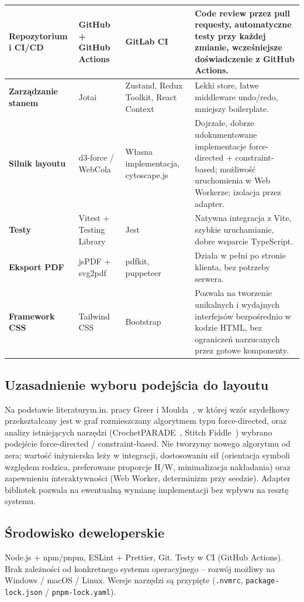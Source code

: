 \documentclass[a4paper,11pt]{article}
\begin{document}
\begin{xltabular}{0.95\textwidth}{|p{2.5cm}|p{2.3cm}|p{3.8cm}|X|}
  \hline
  \textbf{Repozytorium i CI/CD} & GitHub + GitHub Actions & GitLab CI & Code review przez pull requesty, automatyczne testy przy każdej zmianie, wcześniejsze doświadczenie z GitHub Actions. \\
  \hline
  \textbf{Zarządzanie stanem} & Jotai & Zustand, Redux Toolkit, React Context & Lekki store, łatwe middleware undo/redo, mniejszy boilerplate. \\
  \hline
  \textbf{Silnik layoutu} & d3-force / WebCola & Własna implementacja, cytoscape.js & Dojrzałe, dobrze udokumentowane implementacje force-directed + constraint-based; możliwość uruchomienia w Web Workerze; izolacja przez adapter. \\
  \hline
  \textbf{Testy} & Vitest + Testing Library & Jest & Natywna integracja z Vite, szybkie uruchamianie, dobre wsparcie TypeScript. \\
  \hline
  \textbf{Eksport PDF} & jsPDF + svg2pdf & pdfkit, puppeteer & Działa w pełni po stronie klienta, bez potrzeby serwera. \\
  \hline
  \textbf{Framework CSS} & Tailwind CSS & Bootstrap & Pozwala na tworzenie unikalnych i wydajnych interfejsów bezpośrednio w kodzie HTML, bez ograniczeń narzucanych przez gotowe komponenty. \\
  \hline
\end{xltabular}

\subsection{Uzasadnienie wyboru podejścia do layoutu}

Na podstawie literaturym.in. pracy Greer i Moulda~\cite{greer2025modeling}, w której wzór szydełkowy przekształcany jest w graf rozmieszczany algorytmem typu force-directed, oraz analizy istniejących narzędzi (CrochetPARADE~\cite{crochetparade}, Stitch Fiddle~\cite{stitchfiddle}) wybrano podejście force-directed / constraint-based. Nie tworzymy nowego algorytmu od zera; wartość inżynierska leży w integracji, dostosowaniu sił (orientacja symboli względem rodzica, preferowane proporcje H/W, minimalizacja nakładania) oraz zapewnieniu interaktywności (Web Worker, determinizm przy seedzie). Adapter bibliotek pozwala na ewentualną wymianę implementacji bez wpływu na resztę systemu.

\subsection{Środowisko deweloperskie}

Node.js + npm/pnpm, ESLint + Prettier, Git. Testy w CI (GitHub Actions). Brak zależności od konkretnego systemu operacyjnego -- rozwój możliwy na Windows / macOS / Linux. Wersje narzędzi są przypięte (\texttt{.nvmrc}, \texttt{package-lock.json} / \texttt{pnpm-lock.yaml}).

\pagebreak

\printbibliography[heading=bibintoc, title={Bibliografia}]
\end{document}
